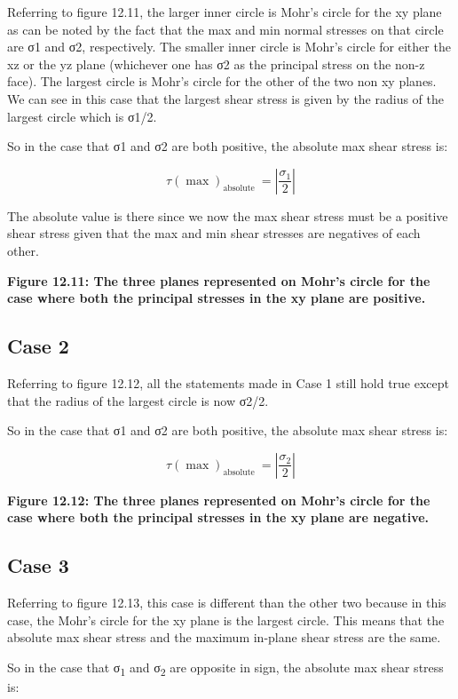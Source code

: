 \documentclass[
  letterpaper,
  DIV=11,
  numbers=noendperiod]{scrreprt}
\begin{document}
Referring to figure 12.11, the larger inner circle is Mohr's circle for
the xy plane as can be noted by the fact that the max and min normal
stresses on that circle are σ1 and σ2, respectively. The smaller inner
circle is Mohr's circle for either the xz or the yz plane (whichever one
has σ2 as the principal stress on the non-z face). The largest circle is
Mohr's circle for the other of the two non xy planes. We can see in this
case that the largest shear stress is given by the radius of the largest
circle which is σ1/2.

So in the case that σ1 and σ2 are both positive, the absolute max shear
stress is:

\[
\tau(\max )_{\text {absolute }}=\left|\frac{\sigma_1}{2}\right|
\]

The absolute value is there since we now the max shear stress must be a
positive shear stress given that the max and min shear stresses are
negatives of each other.

\textbf{Figure 12.11: The three planes represented on Mohr's circle for
the case where both the principal stresses in the xy plane are
positive.}

\subsection{Case 2}\label{case-2}

Referring to figure 12.12, all the statements made in Case 1 still hold
true except that the radius of the largest circle is now σ2/2.

So in the case that σ1 and σ2 are both positive, the absolute max shear
stress is:

\[
\tau(\max )_{\text {absolute }}=\left|\frac{\sigma_2}{2}\right|
\]

\textbf{Figure 12.12: The three planes represented on Mohr's circle for
the case where both the principal stresses in the xy plane are
negative.}

\subsection{Case 3}\label{case-3}

Referring to figure 12.13, this case is different than the other two
because in this case, the Mohr's circle for the xy plane is the largest
circle. This means that the absolute max shear stress and the maximum
in-plane shear stress are the same.

So in the case that σ\textsubscript{1} and σ\textsubscript{2} are
opposite in sign, the absolute max shear stress is:
\end{document}
